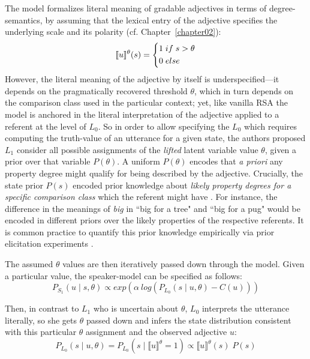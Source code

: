 The model formalizes literal meaning of gradable adjectives in terms of degree-semantics, by assuming that the lexical entry of the adjective specifies the underlying scale and its polarity (cf. Chapter~\ref{chapter02}):
\[
\llbracket u \rrbracket^{\theta} (s) =
\begin{dcases}
1 \; if \;  s > \theta \\
0 \; else
\end{dcases}
\]
However, the literal meaning of the adjective by itself is underspecified---it depends on the pragmatically recovered threshold $\theta$, which in turn depends on the comparison class used in the particular context; yet, like vanilla RSA the model is anchored in the literal interpretation of the adjective applied to a referent at the level of $L_0$.  
So in order to allow specifying the $L_0$ which requires computing the truth-value of an utterance for a given state, the authors proposed $L_1$ consider all possible assignments of the \emph{lifted} latent variable value $\theta$, given a prior over that variable $P(\theta)$. A uniform $P(\theta)$ encodes that \emph{a priori} any property degree might qualify for being described by the adjective. Crucially, the state prior $P(s)$ encoded prior knowledge about \emph{likely property degrees for a specific comparison class} which the referent might have \parencite{lassiter2013context}. For instance, the difference in the meanings of \emph{big} in ``big for a tree" and ``big for a pug" would be encoded in different priors over the likely properties of the respective referents. It is common practice to quantify this prior knowledge empirically via prior elicitation experiments \parencite{problang}.

The assumed $\theta$ values are then iteratively passed down through the model. Given a particular value, the speaker-model can be specified as follows:
\begin{equation}
	P_{S_1} (u \mid s, \theta) \propto exp(\alpha \: log (P_{L_0} (s \mid u, \theta) - C(u)) )
\end{equation}	

Then, in contrast to $L_1$ who is uncertain about $\theta$, $L_0$ interprets the utterance literally, so she gets $\theta$ passed down and infers the state distribution consistent with this particular $\theta$ assignment and the observed adjective $u$:
\begin{equation}
P_{L_0} (s \mid u, \theta) = P_{L_0} (s \mid \llbracket u \rrbracket ^\theta = 1 ) \propto \llbracket u \rrbracket ^\theta (s) \; P(s)
\end{equation}

